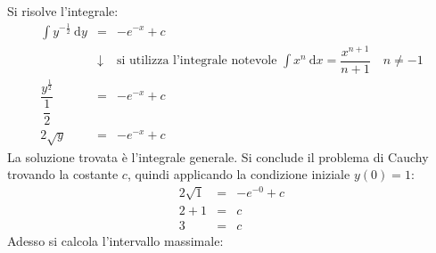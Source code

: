 \documentclass[a4paper]{article}
\begin{document}
	\noindent
	Si risolve l'integrale:
	\begin{equation*}
		\begin{array}{rcl}
			\displaystyle\int y^{-\frac{1}{2}} \: \mathrm{d}y &=& -e^{-x} + c \\ [1em]
			&\downarrow& \text{si utilizza l'integrale notevole } \displaystyle\int x^{n} \: \mathrm{d}x = \dfrac{x^{n+1}}{n+1} \hspace{1em} n \ne -1 \\ [1em]
			\dfrac{y^{\frac{1}{2}}}{\dfrac{1}{2}} &=& -e^{-x} + c \\ [2.5em]
			2\sqrt{y} &=& -e^{-x} + c
		\end{array}
	\end{equation*}
	La soluzione trovata è l'integrale generale. Si conclude il problema di Cauchy trovando la costante $c$, quindi applicando la condizione iniziale $y\left(0\right) = 1$:
	\begin{equation*}
		\begin{array}{rcl}
			2\sqrt{1} &=& -e^{-0} + c \\
			2 + 1 &=& c \\
			3 &=& c
		\end{array}
	\end{equation*}
	Adesso si calcola l'intervallo massimale:
\end{document}
